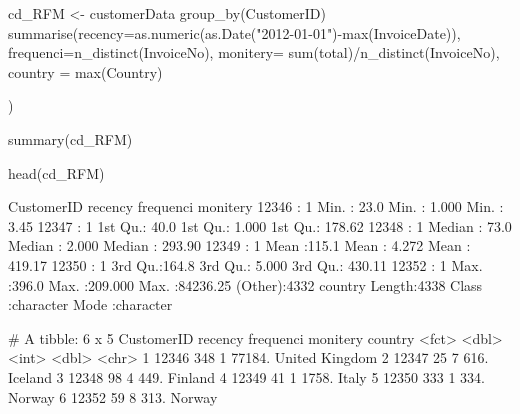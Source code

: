 \begin{Schunk}
\begin{Sinput}
cd_RFM <- customerData %>% 
  group_by(CustomerID) %>% 
  summarise(recency=as.numeric(as.Date("2012-01-01")-max(InvoiceDate)),
            frequenci=n_distinct(InvoiceNo), monitery= sum(total)/n_distinct(InvoiceNo),
            country = max(Country)
      
            ) 

summary(cd_RFM)

head(cd_RFM)
\end{Sinput}
\begin{Soutput}
   CustomerID      recency        frequenci          monitery       
 12346  :   1   Min.   : 23.0   Min.   :  1.000   Min.   :    3.45  
 12347  :   1   1st Qu.: 40.0   1st Qu.:  1.000   1st Qu.:  178.62  
 12348  :   1   Median : 73.0   Median :  2.000   Median :  293.90  
 12349  :   1   Mean   :115.1   Mean   :  4.272   Mean   :  419.17  
 12350  :   1   3rd Qu.:164.8   3rd Qu.:  5.000   3rd Qu.:  430.11  
 12352  :   1   Max.   :396.0   Max.   :209.000   Max.   :84236.25  
 (Other):4332                                                       
   country         
 Length:4338       
 Class :character  
 Mode  :character  
                   
                   
                   
                   
# A tibble: 6 x 5
  CustomerID recency frequenci monitery country       
  <fct>        <dbl>     <int>    <dbl> <chr>         
1 12346          348         1   77184. United Kingdom
2 12347           25         7     616. Iceland       
3 12348           98         4     449. Finland       
4 12349           41         1    1758. Italy         
5 12350          333         1     334. Norway        
6 12352           59         8     313. Norway        
\end{Soutput}
\end{Schunk}

